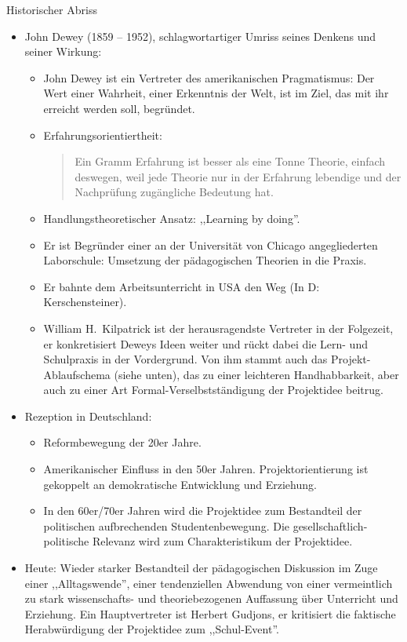 Historischer Abriss
\begin{itemize}
\item John Dewey (1859 -- 1952),
schlagwortartiger Umriss seines Denkens und seiner Wirkung:
\begin{itemize}
\item John Dewey ist ein Vertreter des amerikanischen Pragmatismus:
Der Wert einer Wahrheit, einer Erkenntnis der Welt, ist im Ziel, das mit ihr
erreicht werden soll, begr\"{u}ndet.

\item Erfahrungsorientiertheit:
\begin{quote}
Ein Gramm Erfahrung ist besser als eine Tonne Theorie, einfach deswegen, weil jede
Theorie nur in der Erfahrung lebendige und der Nachpr\"{u}fung zug\"{a}ngliche Bedeutung hat.
\end{quote}

\item Handlungstheoretischer Ansatz: ,,Learning by doing''.

\item Er ist Begr\"{u}nder einer an der Universit\"{a}t von Chicago angegliederten
Laborschule: Umsetzung der p\"{a}dagogischen Theorien in die Praxis.

\item Er bahnte dem Arbeitsunterricht in USA den Weg (In D: Kerschensteiner).

\item William H.\ Kilpatrick ist der herausragendste Vertreter in der Folgezeit,
er konkretisiert Deweys Ideen weiter und r\"{u}ckt dabei die Lern- und Schulpraxis in
der Vordergrund.
Von ihm stammt auch das Projekt-Ablaufschema (siehe unten), das zu einer
leichteren Handhabbarkeit, aber auch zu einer Art Formal-Verselbstst\"{a}ndigung
der Projektidee beitrug.

\end{itemize}

\item Rezeption in Deutschland:
\begin{itemize}
\item Reformbewegung der 20er Jahre.
\item Amerikanischer Einfluss in den 50er Jahren.
Projektorientierung ist gekoppelt an demokratische Entwicklung und Erziehung.
\item In den 60er/70er Jahren wird die Projektidee zum Bestandteil der
politischen aufbrechenden Studenten\-bewegung.
Die gesellschaftlich-politische Relevanz wird zum
Charakteristikum der Projektidee.
\end{itemize}

\item Heute: Wieder starker Bestandteil der p\"{a}dagogischen Diskussion im Zuge
einer ,,Alltagswende'', einer tendenziellen Abwendung von einer
vermeintlich zu stark wissenschafts- und theoriebezogenen Auffassung \"{u}ber Unterricht
und Erziehung. Ein Hauptvertreter ist Herbert Gudjons, er kritisiert die
faktische Herabw\"{u}rdigung der Projektidee zum ,,Schul-Event''.
\end{itemize}

